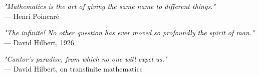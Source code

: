 \begin{flushright}
\emph{"Mathematics is the art of giving the same name to different things."}\\
— Henri Poincaré
\end{flushright}
\vspace{2em}
\begin{flushright}
\emph{"The infinite! No other question has ever moved so profoundly the spirit of man."}\\
— David Hilbert, 1926
\end{flushright}
\vspace{2em}
\begin{flushright}
\emph{"Cantor's paradise, from which no one will expel us."}\\
— David Hilbert, on transfinite mathematics
\end{flushright}
